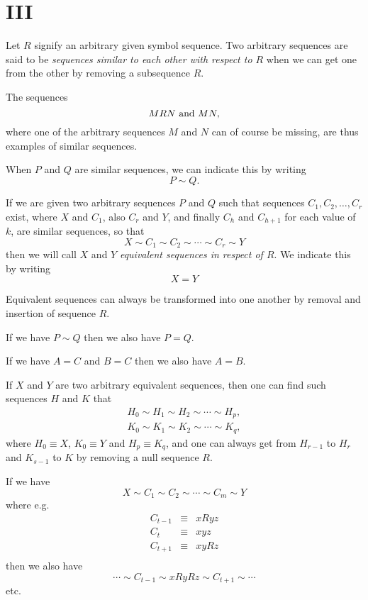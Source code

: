 
\section{III}

Let $R$ signify an arbitrary given symbol sequence.  Two arbitrary
sequences are said to be \emph{sequences similar to each other with
  respect to $R$} when we can get one from the other by removing
a subsequence $R$.

The sequences 
$$MRN \hbox{ and } MN,$$
where one of the arbitrary sequences $M$ and $N$ can of course be
missing, are thus examples of similar sequences.

When $P$ and $Q$ are similar sequences, we can indicate this by
writing
$$P \sim Q.$$

If we are given two arbitrary sequences $P$ and $Q$ such that
sequences $C_1, C_2, \ldots, C_r$ exist, where $X$ and $C_1$, also
$C_r$ and $Y$, and finally $C_h$ and $C_{h+1}$ for each value of $k$,
are similar sequences, so that
$$X \sim C_1 \sim C_2 \sim \cdots \sim C_r \sim Y$$
then we will call $X$ and $Y$ \emph{equivalent sequences in respect of
  $R$}.  We indicate this by writing
$$X = Y$$

Equivalent sequences can always be transformed into one another by
removal and insertion of sequence $R$.

If we have $P \sim Q$ then we also have $P = Q$.

If we have $A=C$ and $B=C$ then we also have $A=B$.

If $X$ and $Y$ are two arbitrary equivalent sequences, then one can
find such sequences $H$ and $K$ that
\begin{gather*}
H_0 \sim H_1 \sim H_2 \sim \cdots \sim H_p,\\
K_0 \sim K_1 \sim K_2 \sim \cdots \sim K_q,
\end{gather*}
where $H_0 \equiv X$, $K_0 \equiv Y$ and $H_p \equiv K_q$,
and one can always get from $H_{r-1}$ to $H_r$ and $K_{s-1}$ to $K$ by
removing a null sequence  $R$.

If we have
$$X \sim C_1 \sim C_2 \sim \cdots \sim C_m \sim Y$$
where e.g.
$$\begin{array}{rcl}
C_{t-1} &\equiv& xRyz\\
C_{t} &\equiv& xyz\\
C_{t+1} &\equiv& xyRz\\
\end{array}$$
then we also have
$$\cdots \sim C_{t-1} \sim xRyRz \sim C_{t+1} \sim \cdots$$
etc.

